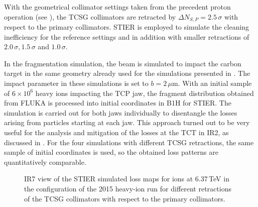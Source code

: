 With the geometrical collimator settings taken from the precedent proton operation (see ), the TCSG collimators are retracted by $\Delta N_{S,P}=2.5\,\sigma$ with respect to the primary collimators. STIER is employed to simulate the cleaning inefficiency for the reference settings and in addition with smaller retractions of $ 2.0\,\sigma, 1.5\,\sigma$ and $1.0\,\sigma$. 

\newpage
In the fragmentation simulation, the \lead beam is simulated to impact the carbon target in the same geometry already used for the simulations presented in . The impact parameter in these simulations is set to $b=2\,\mu$m. With an initial sample of $6\times10^6$ heavy ions impacting the TCP jaw, the fragment distribution obtained from FLUKA is processed into initial coordinates in B1H for STIER. The simulation is carried out for both jaws individually to disentangle the losses arising from particles starting at each jaw. This approach turned out to be very useful for the analysis and mitigation of the losses at the TCT in IR2, as discussed in . For the four simulations with different TCSG retractions, the same sample of initial coordinates is used, so the obtained loss patterns are quantitatively comparable.

\begin{figure}[t]
  \centering
  \caption{IR7 view of the STIER simulated loss maps for \lead ions at 6.37$\,$TeV in the configuration of the 2015 heavy-ion run for different retractions of the TCSG collimators with respect to the primary collimators. }  
  \label{pic:16061502}
  \end{figure}


